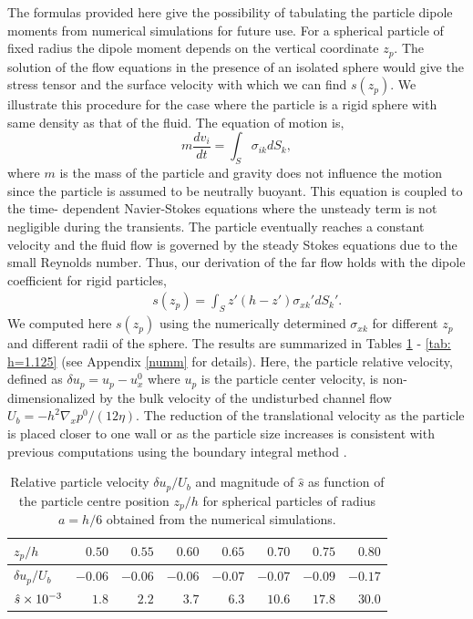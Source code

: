 The formulas provided here give the possibility of tabulating the particle dipole moments from numerical simulations for future use. 
For a spherical particle of fixed radius the dipole moment depends on the vertical coordinate $z_p$. 
The solution of the flow equations in the presence of an isolated sphere would give the stress tensor and the surface velocity 
with which we can find $s(z_p)$. We illustrate this procedure for the case where the particle is a rigid sphere with same density as that of the fluid.
The equation of motion is,
\begin{equation}
    m\frac{dv_i}{dt} =
    \int_{S} \sigma_{ik} dS_k,
\label{eqmp}
\end{equation}
where $m$ is the mass of the particle and gravity does not influence the motion since the particle is assumed to be neutrally buoyant. This equation is coupled to the time-
dependent Navier-Stokes equations where the unsteady
term is not negligible during the transients. 
The particle eventually reaches a constant velocity and the fluid flow is governed by the steady Stokes equations due to the small 
Reynolds number. 
Thus, our derivation of the far flow holds with the dipole coefficient for rigid particles,
\begin{eqnarray}&&\!\!\!\!\!\!\!\!\!\!\!\!\!\!\!\!
s(z_p)=\int_{S}\!\! z'(h\!-\!z') \sigma_{xk}'dS_k'.
\end{eqnarray}
We computed here $s(z_p)$ using the numerically determined $\sigma_{xk}$ for different $z_p$ and different radii of the sphere. The results are summarized in Tables \ref{tab: h=3} - \ref{tab: h=1.125} (see Appendix \ref{numm} for details). Here, the particle relative velocity, defined as $\delta u_p=u_p-u_x^0$ where $u_p$ is the particle center velocity, is non-dimensionalized by the bulk velocity of the undisturbed channel flow $U_b=-h^2\nabla_x p^0/(12\eta)$. 
The reduction of the translational velocity as the particle is placed closer to one wall or as the particle size increases is consistent with previous computations using the 
boundary integral method \cite{bim_1p}.

\begin{table}[t]
 \centering
   \caption{Relative particle velocity $\delta u_p/U_b$ and magnitude of $\hat{s}$ as function of the particle centre position $z_p/h$ for spherical particles of radius $a=h/6$ obtained from the numerical simulations. }%
   \tabulinesep=1.2mm
   \begin{tabular}{l r r r r r r r}
       \hline
       $z_p/h$              &$0.50$   &$0.55$   &$0.60$   &$0.65$   &$0.70$  &$0.75$   &$0.80$\\
       \hline
       $\delta u_p/U_b$     &$-0.06$  &$-0.06$  &$-0.06$  &$-0.07$  &$-0.07$ &$-0.09$  &$-0.17$\\
       $\hat{s} \times 10^{-3}$     &$1.8$    &$2.2$    &$3.7$    &$6.3$    &$10.6$   &$17.8$    &$30.0$\\
       \hline
   \end{tabular}
   \label{tab: h=3}
\end{table}



